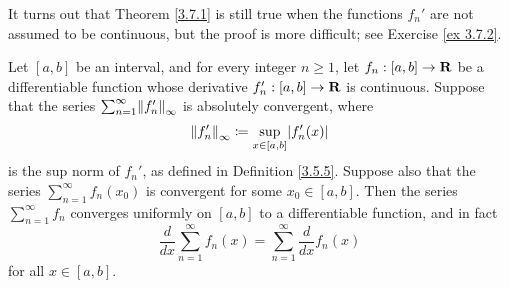 \begin{remark}\label{3.7.2}
    It turns out that Theorem \ref{3.7.1} is still true when the functions \(f_n'\) are not assumed to be continuous, but the proof is more difficult;
    see Exercise \ref{ex 3.7.2}.
\end{remark}

\begin{corollary}\label{3.7.3}
    Let \([a, b]\) be an interval, and for every integer \(n \geq 1\), let \(f_n : [a, b] \to \mathbf{R}\) be a differentiable function whose derivative \(f_n' : [a, b] \to \mathbf{R}\) is continuous.
    Suppose that the series \(\sum_{n = 1}^\infty \norm*{f_n'}_\infty\) is absolutely convergent, where
    \[
        \norm*{f_n'}_\infty \coloneqq \sup_{x \in [a, b]} \abs{f_n'(x)}
    \]
    is the sup norm of \(f_n'\), as defined in Definition \ref{3.5.5}.
    Suppose also that the series \(\sum_{n = 1}^\infty f_n(x_0)\) is convergent for some \(x_0 \in [a, b]\).
    Then the series \(\sum_{n = 1}^\infty f_n\) converges uniformly on \([a, b]\) to a differentiable function, and in fact
    \[
        \frac{d}{dx} \sum_{n = 1}^\infty f_n(x) = \sum_{n = 1}^\infty \frac{d}{dx} f_n(x)
    \]
    for all \(x \in [a, b]\).
\end{corollary}

